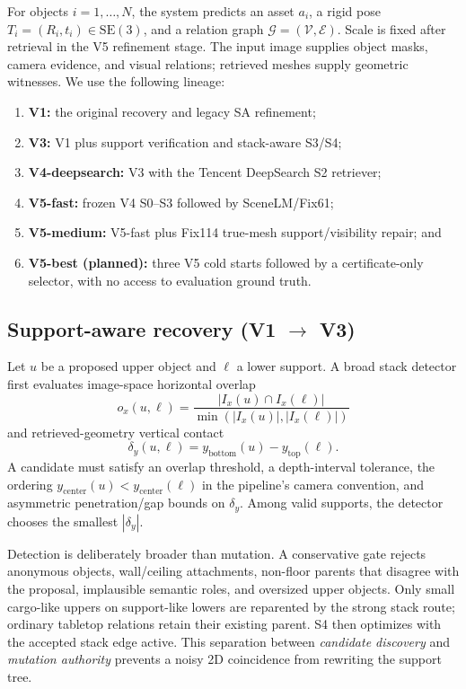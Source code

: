\documentclass[10pt,twocolumn]{article}
\begin{document}
For objects $i=1,\ldots,N$, the system predicts an asset $a_i$, a rigid pose
$T_i=(R_i,t_i)\in\mathrm{SE}(3)$, and a relation graph
$\mathcal{G}=(\mathcal{V},\mathcal{E})$.  Scale is fixed after retrieval in the
V5 refinement stage.  The input image supplies object masks, camera evidence,
and visual relations; retrieved meshes supply geometric witnesses.  We use the
following lineage:
\begin{enumerate}
  \item \textbf{V1:} the original recovery and legacy SA refinement;
  \item \textbf{V3:} V1 plus support verification and stack-aware S3/S4;
  \item \textbf{V4-deepsearch:} V3 with the Tencent DeepSearch S2 retriever;
  \item \textbf{V5-fast:} frozen V4 S0--S3 followed by SceneLM/Fix61;
  \item \textbf{V5-medium:} V5-fast plus Fix114 true-mesh support/visibility
  repair; and
  \item \textbf{V5-best (planned):} three V5 cold starts followed by a
  certificate-only selector, with no access to evaluation ground truth.
\end{enumerate}

\subsection{Support-aware recovery (V1 $\rightarrow$ V3)}

Let $u$ be a proposed upper object and $\ell$ a lower support.  A broad stack
detector first evaluates image-space horizontal overlap
\begin{equation}
  o_x(u,\ell)=
  \frac{|I_x(u)\cap I_x(\ell)|}
       {\min(|I_x(u)|,|I_x(\ell)|)}
\end{equation}
and retrieved-geometry vertical contact
\begin{equation}
  \delta_y(u,\ell)=y_{\mathrm{bottom}}(u)-y_{\mathrm{top}}(\ell).
\end{equation}
A candidate must satisfy an overlap threshold, a depth-interval tolerance, the
ordering $y_{\mathrm{center}}(u)<y_{\mathrm{center}}(\ell)$ in the pipeline's
camera convention, and asymmetric penetration/gap bounds on $\delta_y$.  Among
valid supports, the detector chooses the smallest $|\delta_y|$.

Detection is deliberately broader than mutation.  A conservative gate rejects
anonymous objects, wall/ceiling attachments, non-floor parents that disagree
with the proposal, implausible semantic roles, and oversized upper objects.
Only small cargo-like uppers on support-like lowers are reparented by the strong
stack route; ordinary tabletop relations retain their existing parent.  S4
then optimizes with the accepted stack edge active.  This separation between
\emph{candidate discovery} and \emph{mutation authority} prevents a noisy 2D
coincidence from rewriting the support tree.
\end{document}
